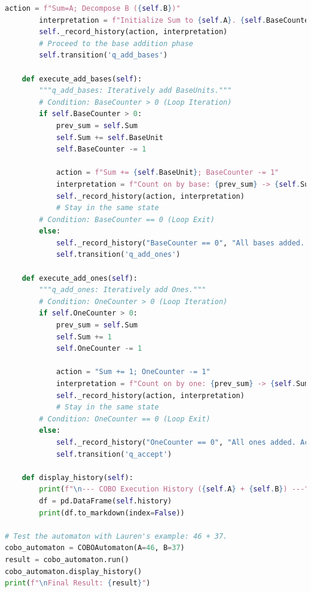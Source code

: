 \documentclass[11pt]{article}
\begin{document}
\begin{lstlisting}[language=Python]
        action = f"Sum=A; Decompose B ({self.B})"
        interpretation = f"Initialize Sum to {self.A}. {self.BaseCounter} Bases, {self.OneCounter} Ones."
        self._record_history(action, interpretation)
        # Proceed to the base addition phase
        self.transition('q_add_bases')

    def execute_add_bases(self):
        """q_add_bases: Iteratively add BaseUnits."""
        # Condition: BaseCounter > 0 (Loop Iteration)
        if self.BaseCounter > 0:
            prev_sum = self.Sum
            self.Sum += self.BaseUnit
            self.BaseCounter -= 1

            action = f"Sum += {self.BaseUnit}; BaseCounter -= 1"
            interpretation = f"Count on by base: {prev_sum} -> {self.Sum}."
            self._record_history(action, interpretation)
            # Stay in the same state
        # Condition: BaseCounter == 0 (Loop Exit)
        else:
            self._record_history("BaseCounter == 0", "All bases added. Transition to adding ones.")
            self.transition('q_add_ones')

    def execute_add_ones(self):
        """q_add_ones: Iteratively add Ones."""
        # Condition: OneCounter > 0 (Loop Iteration)
        if self.OneCounter > 0:
            prev_sum = self.Sum
            self.Sum += 1
            self.OneCounter -= 1

            action = "Sum += 1; OneCounter -= 1"
            interpretation = f"Count on by one: {prev_sum} -> {self.Sum}."
            self._record_history(action, interpretation)
            # Stay in the same state
        # Condition: OneCounter == 0 (Loop Exit)
        else:
            self._record_history("OneCounter == 0", "All ones added. Accept.")
            self.transition('q_accept')

    def display_history(self):
        print(f"\n--- COBO Execution History ({self.A} + {self.B}) ---")
        df = pd.DataFrame(self.history)
        print(df.to_markdown(index=False))

# Test the automaton with Lauren's example: 46 + 37.
cobo_automaton = COBOAutomaton(A=46, B=37)
result = cobo_automaton.run()
cobo_automaton.display_history()
print(f"\nFinal Result: {result}")
\end{lstlisting}
\end{document}
